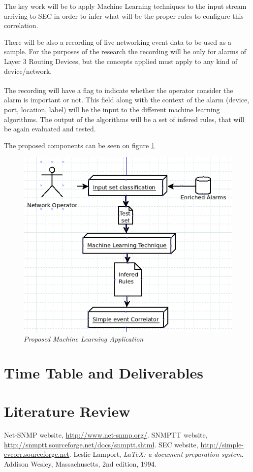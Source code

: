 \documentclass[10pt,a4paper]{article}
\begin{document}
The key work will be to apply Machine Learning techniques to the input stream arriving to SEC in order to infer what will be the proper rules to configure this correlation.

There will be also a recording of live networking event data to be used as a sample. For the purposes of the research the recording will be only for alarms of Layer 3 Routing Devices, but the concepts applied must apply to any kind of device/network.
\\\\
The recording will have a flag to indicate whether the operator consider the alarm is important or not. This field along with the context of the alarm (device, port, location, label) will be the input to the different machine learning algorithms. The output of the algorithms will be a set of infered rules, that will be again evaluated and tested.

The proposed components can be seen on figure \ref{fig:ml_componentdiagram}

\begin{figure}[H]
 \includegraphics[scale=0.5]{ML_ProposedComponents.png}
  \centering
  \caption{\textit{Proposed Machine Learning Application}}
  \label{fig:ml_componentdiagram}
\end{figure}	

  \section{Time Table and Deliverables}
  \section{Literature Review}

\begin{thebibliography}{9}

Net-SNMP website, \url{http://www.net-snmp.org/}.
SNMPTT website, \url{http://snmptt.sourceforge.net/docs/snmptt.shtml}.
SEC website, \url{http://simple-evcorr.sourceforge.net}.
  Leslie Lamport,
  \emph{\LaTeX: a document preparation system}.
  Addison Wesley, Massachusetts,
  2nd edition,
  1994.

\end{thebibliography}
    
\end{document}
